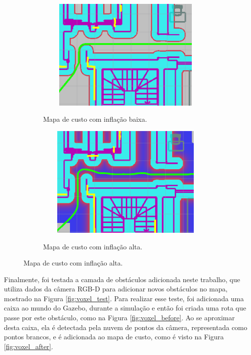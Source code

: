 \documentclass[repeatfields,xlists,xpacks,oneside,yearsonly]{ufrgscca}
\begin{document}
\begin{figure}[h]
    \caption{Trajetórias criadas com diferentes configurações da camada de inflação}
    \begin{subfigure}{0.5\linewidth}
        {
            \centering
            \caption{Mapa de custo com inflação baixa.}
            \label{fig:inflation_low}
            \includegraphics[width=0.98\textwidth, height=5.5cm]{costmap_not_inflated.png}\\
        }
    \end{subfigure}
    \begin{subfigure}{0.5\linewidth}
        {
            \centering
            \caption{Mapa de custo com inflação alta.}
            \label{fig:inflation_high}
            \includegraphics[width=0.98\textwidth, height=5.5cm]{costmap_inflated.png}\\
        }
    \end{subfigure}
\end{figure}

Finalmente, foi testada a camada de obstáculos adicionada neste
trabalho, que utiliza dados da câmera RGB-D para adicionar novos
obstáculos no mapa, mostrado na Figura \ref{fig:voxel_test}. Para
realizar esse teste, foi adicionada uma caixa ao mundo do Gazebo,
durante a simulação e então foi criada uma rota que passe por este
obstáculo, como na Figura \ref{fig:voxel_before}. Ao se aproximar
desta caixa, ela é detectada pela nuvem de pontos da câmera,
representada como pontos brancos, e é adicionada ao mapa de custo,
como é visto na Figura \ref{fig:voxel_after}.
\end{document}
